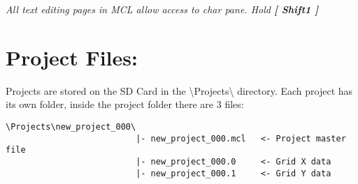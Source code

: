 \textit{All text editing pages in MCL allow access to char pane. Hold \textbf{[ Shift1 ]}}

\section{Project Files:}
Projects are stored on the SD Card in the \textbackslash{}Projects\textbackslash{} directory.
Each project has its own folder, inside the project folder there are 3 files:
\begin{verbatim}
\Projects\new_project_000\
                          |- new_project_000.mcl   <- Project master file
                          |- new_project_000.0     <- Grid X data
                          |- new_project_000.1     <- Grid Y data
\end{verbatim}